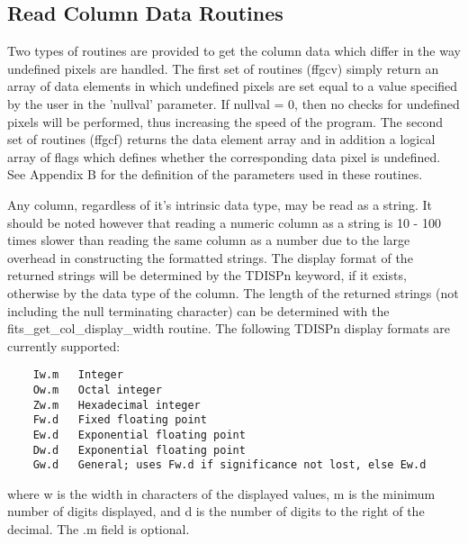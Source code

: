 \documentclass[11pt]{book}
\begin{document}
\subsection{Read Column Data Routines \label{specialized-read-column-data}}

Two types of routines are provided to get the column data which differ
in the way undefined pixels are handled.  The first set of routines
(ffgcv) simply return an array of data elements in which undefined
pixels are set equal to a value specified by the user in the 'nullval'
parameter.  If nullval = 0, then no checks for undefined pixels will be
performed, thus increasing the speed of the program.  The second set of
routines (ffgcf) returns the data element array and in addition a
logical array of flags which defines whether the corresponding data
pixel is undefined.  See Appendix B for the definition of the
parameters used in these routines.

    Any column, regardless of it's intrinsic data type, may be read as a
    string.  It should be noted however that reading a numeric column as
    a string is 10 - 100 times slower than reading the same column as a number
    due to the large overhead in constructing the formatted strings.
    The display format of the returned strings will be
    determined by the TDISPn keyword, if it exists, otherwise by the
    data type of the column.  The length of the returned strings (not
    including the null terminating character) can be determined with
    the fits\_get\_col\_display\_width routine.  The following TDISPn
    display formats are currently supported:

\begin{verbatim}
    Iw.m   Integer
    Ow.m   Octal integer
    Zw.m   Hexadecimal integer
    Fw.d   Fixed floating point
    Ew.d   Exponential floating point
    Dw.d   Exponential floating point
    Gw.d   General; uses Fw.d if significance not lost, else Ew.d
\end{verbatim}
    where w is the width in characters of the displayed values, m is
    the minimum number of digits displayed, and d is the number of
    digits to the right of the decimal.  The .m field is optional.
\end{document}

